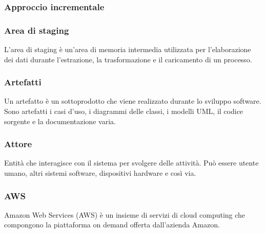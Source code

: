 \subsubsection*{Approccio incrementale}

\subsubsection*{Area di staging}
L'area di staging è un'area di memoria intermedia utilizzata per l'elaborazione dei dati durante l'estrazione, la trasformazione e il caricamento di un processo.

\subsubsection*{Artefatti}
Un artefatto è un sottoprodotto che viene realizzato durante lo sviluppo software. Sono artefatti i casi d'uso, i diagrammi delle classi, i modelli UML\glo, il codice sorgente e la documentazione varia.

\subsubsection*{Attore}
Entità che interagisce con il sistema per svolgere delle attività. Può essere utente umano, altri sistemi software, dispositivi hardware e così via.

\subsubsection*{AWS}
Amazon Web Services (AWS) è un insieme di servizi di cloud computing che compongono la piattaforma on demand offerta dall’azienda Amazon.

